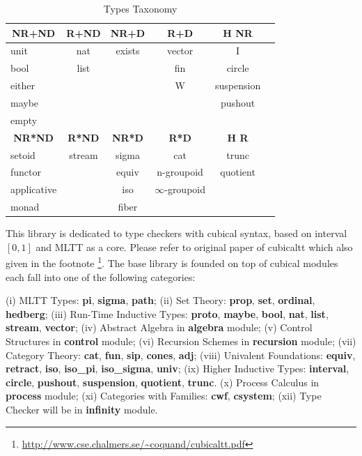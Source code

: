 \documentclass{article}
\newcommand*{\thead}[1]{\multicolumn{1}{c}{\bfseries #1}}
\begin{document}
\begin{table}[h]
\centering
\caption{Types Taxonomy}
\label{tab:a}
\begin{tabular}{lccccc}
\hline
\thead{NR+ND} & \thead{R+ND} & \thead{NR+D} & \thead{R+D} & \thead{H NR}\\
\hline
unit        & nat    & exists  & vector & I \\
bool        & list   &         & fin    & circle \\
either      &        &         & W      & suspension \\
maybe       &        &         &        & pushout \\
empty       &        &         &        & \\
\hline
\thead{NR*ND} & \thead{R*ND} & \thead{NR*D} & \thead{R*D} &\thead{H R}\\
\hline
setoid      & stream & sigma   & cat               & trunc \\
functor     &        & equiv   & n-groupoid        & quotient \\
applicative &        & iso     & $\infty$-groupoid & \\
monad       &        & fiber   &                   & \\
\end{tabular}
\end{table}


This library is dedicated to type checkers with cubical syntax,
based on interval $[0,1]$ and MLTT as a core.
Please refer to original paper of cubicaltt \cite{Mortberg17}
which also given in the footnote \footnote{\url{http://www.cse.chalmers.se/~coquand/cubicaltt.pdf}}.
The base library is founded on top of cubical modules each
fall into one of the following categories:

(i) MLTT Types: {\bf pi}, {\bf sigma}, {\bf path};
(ii) Set Theory: {\bf prop}, {\bf set}, {\bf ordinal}, {\bf hedberg};
(iii) Run-Time Inductive Types: {\bf proto}, {\bf maybe}, {\bf bool}, {\bf nat}, {\bf list}, {\bf stream}, {\bf vector};
(iv) Abstract Algebra in {\bf algebra} module;
(v) Control Structures in {\bf control} module;
(vi) Recursion Schemes in {\bf recursion} module;
(vii) Category Theory: {\bf cat}, {\bf fun}, {\bf sip}, {\bf cones}, {\bf adj};
(viii) Univalent Foundations: {\bf equiv}, {\bf retract}, {\bf iso}, {\bf iso\_pi}, {\bf iso\_sigma}, {\bf univ};
(ix) Higher Inductive Types: {\bf interval}, {\bf circle}, {\bf pushout}, {\bf suspension}, {\bf quotient}, {\bf trunc}.
(x) Process Calculus in {\bf process} module;
(xi) Categories with Families: {\bf cwf}, {\bf csystem};
(xii) Type Checker will be in {\bf infinity} module.
\end{document}
